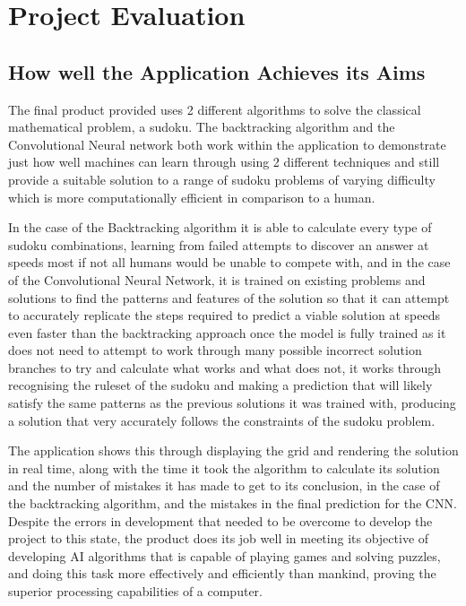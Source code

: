 \documentclass[]{final_report}
\begin{document}
\chapter{Project Evaluation}

\section{How well the Application Achieves its Aims}
The final product provided uses 2 different algorithms to solve the classical mathematical problem, a sudoku. The backtracking algorithm and the Convolutional Neural network both work within the application to demonstrate just how well machines can learn through using 2 different techniques and still provide a suitable solution to a range of sudoku problems of varying difficulty which is more computationally efficient in comparison to a human. 

In the case of the Backtracking algorithm it is able to calculate every type of sudoku combinations, learning from failed attempts to discover an answer at speeds most if not all humans would be unable to compete with, and in the case of the Convolutional Neural Network, it is trained on existing problems and solutions to find the patterns and features of the solution so that it can attempt to accurately replicate the steps required to predict a viable solution at speeds even faster than the backtracking approach once the model is fully trained as it does not need to attempt to work through many possible incorrect solution branches to try and calculate what works and what does not, it works through recognising the ruleset of the sudoku and making a prediction that will likely satisfy the same patterns as the previous solutions it was trained with, producing a solution that very accurately follows the constraints of the sudoku problem.

The application shows this through displaying the grid and rendering the solution in real time, along with the time it took the algorithm to calculate its solution and the number of mistakes it has made to get to its conclusion, in the case of the backtracking algorithm, and the mistakes in the final prediction for the CNN. Despite the errors in development that needed to be overcome to develop the project to this state, the product does its job well in meeting its objective of developing AI algorithms that is capable of playing games and solving puzzles, and doing this task more effectively and efficiently than mankind, proving the superior processing capabilities of a computer.
\end{document}
